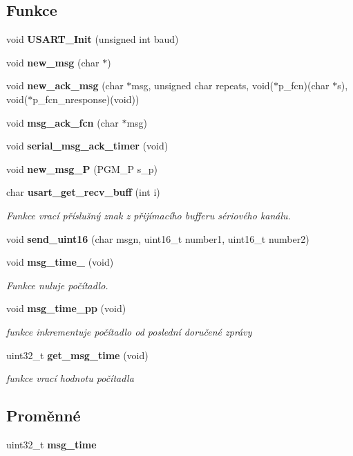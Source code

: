 \subsection*{Funkce}
\begin{DoxyCompactItemize}
\item 
void {\bf USART\_\-Init} (unsigned int baud)
\item 
void {\bf new\_\-msg} (char $\ast$)
\item 
void {\bf new\_\-ack\_\-msg} (char $\ast$msg, unsigned char repeats, void($\ast$p\_\-fcn)(char $\ast$s), void($\ast$p\_\-fcn\_\-nresponse)(void))
\item 
void {\bf msg\_\-ack\_\-fcn} (char $\ast$msg)
\item 
void {\bf serial\_\-msg\_\-ack\_\-timer} (void)
\item 
void {\bf new\_\-msg\_\-P} (PGM\_\-P s\_\-p)
\item 
char {\bf usart\_\-get\_\-recv\_\-buff} (int i)
\begin{DoxyCompactList}\small\item\em Funkce vrací příslušný znak z přijímacího bufferu sériového kanálu. \item\end{DoxyCompactList}\item 
void {\bf send\_\-uint16} (char msgn, uint16\_\-t number1, uint16\_\-t number2)
\item 
void {\bf msg\_\-time\_} (void)
\begin{DoxyCompactList}\small\item\em Funkce nuluje počítadlo. \item\end{DoxyCompactList}\item 
void {\bf msg\_\-time\_\-pp} (void)
\begin{DoxyCompactList}\small\item\em funkce inkrementuje počítadlo od poslední doručené zprávy \item\end{DoxyCompactList}\item 
uint32\_\-t {\bf get\_\-msg\_\-time} (void)
\begin{DoxyCompactList}\small\item\em funkce vrací hodnotu počítadla \item\end{DoxyCompactList}\end{DoxyCompactItemize}
\subsection*{Proměnné}
\begin{DoxyCompactItemize}
\item 
uint32\_\-t {\bf msg\_\-time}
\end{DoxyCompactItemize}


